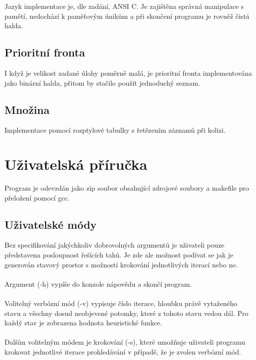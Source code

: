\documentclass[12pt]{article}
\begin{document}
Jazyk implementace je, dle zadání, ANSI C. Je zajištěna správná manipulace s
pamětí, nedochází k paměťovým únikům a při skončení programu je rovněž čistá
halda.

\subsection{Prioritní fronta}
I když je velikost zadané úlohy poměrně malá, je prioritní fronta
implementována jako binární halda, přitom by stačilo použít jednoduchý seznam.

\subsection{Množina}
Implementace pomocí rozptylové tabulky s řetězením záznamů při kolizi.


\section{Uživatelská příručka}
Program je odevzdán jako zip soubor obsahující zdrojové soubory a makefile pro
přeložení pomocí gcc.

\subsection{Uživatelské módy}
Bez specifikování jakýchkoliv dobrovolných argumentů je uživateli pouze
představena posloupnost řešících tahů. Je zde ale možnost podívat se jak je
generován stavový prostor s možností krokování jednotlivých iterací nebo ne.

\paragraph{}
Argument (-h) vypíše do konzole nápovědu a skončí program.

\paragraph{}
Volitelný verbózní mód (-v) vypisuje číslo iterace, hloubku právě vytaženého
stavu a všechny dosud neobjevené potomky, které z tohoto stavu vedou dál. Pro
každý stav je zobrazena hodnota heuristické funkce.

\paragraph{}
Dalším volitelným módem je krokování (-s), které umožňuje uživateli programu
krokovat jednotlivé iterace prohledávání v případě, že je zvolen verbózní mód.
\end{document}
